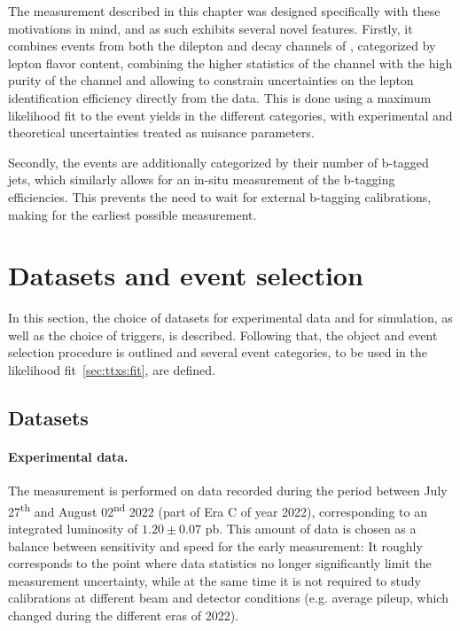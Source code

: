 The measurement described in this chapter was designed specifically with these motivations in mind, and as such exhibits several novel features. Firstly, it combines events from both the dilepton and \ljets decay channels of \ttbar, categorized by lepton flavor content, combining the higher statistics of the \ljets channel with the high purity of the \emu channel and allowing to constrain uncertainties on the lepton identification efficiency directly from the data. This is done using a maximum likelihood fit to the event yields in the different categories, with experimental and theoretical uncertainties treated as nuisance parameters.

Secondly, the events are additionally categorized by their number of b-tagged jets, which similarly allows for an in-situ measurement of the b-tagging efficiencies. This prevents the need to wait for external b-tagging calibrations, making for the earliest possible measurement.

\section{Datasets and event selection}

In this section, the choice of datasets for experimental data and for simulation, as well as the choice of triggers, is described. Following that, the object and event selection procedure is outlined and several event categories, to be used in the likelihood fit~\ref{sec:ttxs:fit}, are defined. 

\subsection{Datasets}
\label{sec:ttxs:datasets}

\paragraph{Experimental data.}
The measurement is performed on data recorded during the period between July 27\textsuperscript{th} and August 02\textsuperscript{nd} 2022 (part of Era C of year 2022), corresponding to an integrated luminosity of $1.20 \pm 0.07$ pb. This amount of data is chosen as a balance between sensitivity and speed for the early measurement: It roughly corresponds to the point where data statistics no longer significantly limit the measurement uncertainty, while at the same time it is not required to study calibrations at different beam and detector conditions (e.g. average pileup, which changed during the different eras of 2022).

